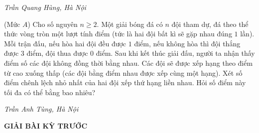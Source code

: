 \begin{multicols}{2}
	\begin{flushright}
		\textit{Trần Quang Hùng, Hà Nội}
	\end{flushright}
	{}
	(Mức $A$) Cho số nguyên $n\ge2$. Một giải bóng đá có $n$ đội tham dự, đá theo thể thức vòng tròn một lượt tính điểm (tức là hai đội bất kì sẽ gặp nhau đúng $1$ lần). Mỗi trận đấu, nếu hòa hai đội đều được $1$ điểm, nếu không hòa thì đội thắng được $3$ điểm, đội thua được $0$ điểm. Sau khi kết thúc giải đấu, người ta nhận thấy điểm số các đội không đồng thời bằng nhau. Các đội sẽ được xếp hạng theo điểm từ cao xuống thấp (các đội bằng điểm nhau được xếp cùng một hạng). Xét số điểm chênh lệch nhỏ nhất của hai đội xếp thứ hạng liền nhau. Hỏi số điểm này tối đa có thể bằng bao nhiêu?
	\begin{flushright}
		\textit{Trần Anh Tùng, Hà Nội}
	\end{flushright}
\end{multicols}
\newpage
	\begin{center}
		{\large{\textbf{\color{thachthuctoanhoc}GIẢI BÀI KỲ TRƯỚC}}}
	\end{center}
